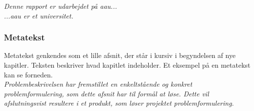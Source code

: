 \noindent \textit{Denne rapport er udarbejdet på \gls{aau}... \\
\noindent ...\gls{aau} er et universitet. }

\subsubsection*{Metatekst}
Metatekst genkendes som et lille afsnit, der står i kursiv i begyndelsen af nye kapitler. Teksten beskriver hvad kapitlet indeholder. Et eksempel på en metatekst kan se forneden.\\

\noindent \textit{Problembeskrivelsen har fremstillet en enkeltstående og konkret problemformulering, som dette afsnit har til formål at løse. Dette vil afslutningsvist resultere i et produkt, som løser projektet problemformulering.}


